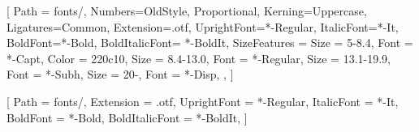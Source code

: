 
\usepackage[no-math]{fontspec}




\usepackage{mathspec}

% 
% 
%

\setmainfont{MinionPro}[%
    Path = fonts/,
    Numbers={OldStyle, Proportional},
    Kerning=Uppercase,
    Ligatures={Common},
    Extension=.otf,
    UprightFont=*-Regular,
    ItalicFont=*-It,
    BoldFont=*-Bold,
    BoldItalicFont= *-BoldIt,
    SizeFeatures = {
        {Size = {5-8.4}, Font = *-Capt, Color = 220c10},
        {Size = {8.4-13.0}, Font = *-Regular},
        {Size = {13.1-19.9}, Font = *-Subh},
        {Size = {20-}, Font = *-Disp},
    },
]

\setsansfont{MyriadPro}[%
    Path = fonts/,
    Extension = .otf,
    UprightFont = *-Regular,
    ItalicFont = *-It,
    BoldFont = *-Bold,
    BoldItalicFont = *-BoldIt,
]